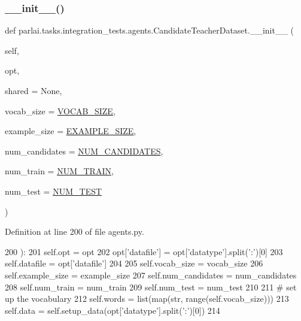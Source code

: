 \subsubsection{\texorpdfstring{\+\_\+\+\_\+init\+\_\+\+\_\+()}{\_\_init\_\_()}}
{\footnotesize\ttfamily def parlai.\+tasks.\+integration\+\_\+tests.\+agents.\+Candidate\+Teacher\+Dataset.\+\_\+\+\_\+init\+\_\+\+\_\+ (\begin{DoxyParamCaption}\item[{}]{self,  }\item[{}]{opt,  }\item[{}]{shared = {\ttfamily None},  }\item[{}]{vocab\+\_\+size = {\ttfamily \hyperlink{namespaceparlai_1_1tasks_1_1integration__tests_1_1agents_acce0481273f02014fb577733cfa8f2b7}{V\+O\+C\+A\+B\+\_\+\+S\+I\+ZE}},  }\item[{}]{example\+\_\+size = {\ttfamily \hyperlink{namespaceparlai_1_1tasks_1_1integration__tests_1_1agents_a1a9a556c90b625c74c9afd0a1a82ca3c}{E\+X\+A\+M\+P\+L\+E\+\_\+\+S\+I\+ZE}},  }\item[{}]{num\+\_\+candidates = {\ttfamily \hyperlink{namespaceparlai_1_1tasks_1_1integration__tests_1_1agents_a43719015a313515dcd768b12491ec3a1}{N\+U\+M\+\_\+\+C\+A\+N\+D\+I\+D\+A\+T\+ES}},  }\item[{}]{num\+\_\+train = {\ttfamily \hyperlink{namespaceparlai_1_1tasks_1_1integration__tests_1_1agents_abc5a5ed634c3ec4aa371a49b883d37a1}{N\+U\+M\+\_\+\+T\+R\+A\+IN}},  }\item[{}]{num\+\_\+test = {\ttfamily \hyperlink{namespaceparlai_1_1tasks_1_1integration__tests_1_1agents_ad6197fa4ad385bde5542da3aa644ad8b}{N\+U\+M\+\_\+\+T\+E\+ST}} }\end{DoxyParamCaption})}



Definition at line 200 of file agents.\+py.


\begin{DoxyCode}
200     ):
201         self.opt = opt
202         opt[\textcolor{stringliteral}{'datafile'}] = opt[\textcolor{stringliteral}{'datatype'}].split(\textcolor{stringliteral}{':'})[0]
203         self.datafile = opt[\textcolor{stringliteral}{'datafile'}]
204 
205         self.vocab\_size = vocab\_size
206         self.example\_size = example\_size
207         self.num\_candidates = num\_candidates
208         self.num\_train = num\_train
209         self.num\_test = num\_test
210 
211         \textcolor{comment}{# set up the vocabulary}
212         self.words = list(map(str, range(self.vocab\_size)))
213         self.data = self.setup\_data(opt[\textcolor{stringliteral}{'datatype'}].split(\textcolor{stringliteral}{':'})[0])
214 
\end{DoxyCode}


